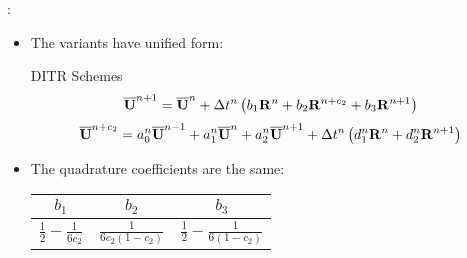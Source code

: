 \documentclass[aspectratio=169,serif]{beamer} %
\begin{document}
\begin{frame}{\secname: \subsecname}
  \begin{itemize}
    \item The variants have unified form:
          \begin{block}{DITR Schemes}
            \begin{equation}
              \overline{\mathbf{U}}^{n+1} = \overline{\mathbf{U}}^{n} + {\Delta} t^n\left(
              b_1 \mathbf{R}^n +
              b_2 \mathbf{R}^{n+c_2} +
              b_3 \mathbf{R}^{n+1}
              \right)
              \label{eq:DISum}
            \end{equation}
            \begin{equation}
              \label{eq:TRSum}
              \overline{\mathbf{U}}^{n+c_2}  =
              a^n_0\overline{\mathbf{U}}^{n - 1} +
              a^n_1\overline{\mathbf{U}}^{n} +
              a^n_2\overline{\mathbf{U}}^{n + 1}
              +
              {\Delta} t^n
              \left(
              d^n_1\mathbf{R}^{n} +
              d^n_2\mathbf{R}^{n + 1}
              \right)
            \end{equation}
          \end{block}
    \item The quadrature coefficients are the same:
          \begin{table}[htbp]
            \centering
            \begin{tabular}{|c|c|c|}
              \hline
              $b_1$                            & $b_2$ & $b_3$ \\
              \hline
              $\frac{1}{2} - \frac{1}{6{c_2}}$ &
              $\frac{1}{6{c_2}(1-{c_2})}$      &
              $\frac{1}{2} - \frac{1}{6(1-{c_2})} $            \\
              \hline
            \end{tabular}
            \label{tab:integ0Tab}
          \end{table}
  \end{itemize}
\end{frame}
\end{document}
